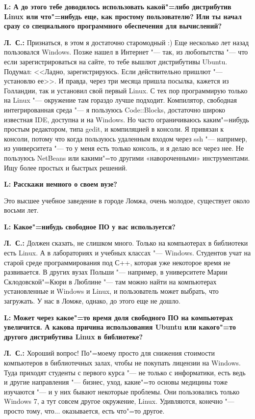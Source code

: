 \documentclass[10pt, a5paper]{article}
\begin{document}
{\noindent \bf L: А до этого тебе доводилось использовать какой"=либо дистрибутив Linux или что"=нибудь еще, как простому пользователю? Или ты начал сразу со специального программного обеспечения для вычислений?}

{\noindent \bf Л.~С.:} Признаться, в этом я достаточно старомодный :) Еще несколько лет назад пользовался Windows. Позже нашел в Интернет "--- так, из любопытства "--- что если зарегистрироваться на сайте, то тебе вышлют дистрибутивы Ubuntu. Подумал: <<Ладно, зарегистрируюсь. Если действительно пришлют "--- установлю ее>>. И правда, через три месяца пришла посылка, кажется из Голландии, так и установил свой первый Linux. С тех пор программирую только на Linux "--- окружение там гораздо лучше подходит. Компилятор, свободная интегрированная среда "--- я пользуюсь Code::Blocks, достаточно широко известная IDE, доступна и на Windows. Но часто ограничиваюсь каким"=нибудь простым редактором, типа gedit, и компиляцией в консоли. Я привязан к консоли, потому что когда пользуюсь удаленным входом через ssh "--- например, из университета "--- то у меня есть только консоль, и я делаю все через нее. Не пользуюсь NetBeans или какими"=то другими «навороченными» инструментами. Ищу более простых и быстрых решений.

{\noindent \bf L: Расскажи немного о своем вузе?}

\noindent Это высшее учебное заведение в городе Ломжа, очень молодое, существует около восьми лет. 

{\noindent \bf L: Какое"=нибудь свободное ПО у вас используется?}

{\noindent \bf Л.~С.:} Должен сказать, не слишком много. Только на компьютерах в библиотеки есть Linux. А в лабораториях и учебных классах "--- Windows. Студентов учат на старой среде программирования под С++, которая уже некоторое время не развивается. В других вузах Польши "--- например, в университете Марии Склодовской"=Кюри в Люблине "--- там можно найти на компьютерах установленные и Windows и Linux, и пользователь может выбрать, что загружать. У нас в Ломже, однако, до этого еще не дошло.

{\noindent \bf L: Может через какое"=то время доля свободного ПО на компьютерах увеличится. А какова причина использования Ubuntu или какого"=то другого дистрибутива Linux в библиотеке?}

{\noindent \bf Л.~С.:} Хороший вопрос! По"=моему просто для снижения стоимости компьютеров в библиотечных залах, чтобы не покупать лицензии на Windows. Туда приходят студенты с первого курса "--- не только с информатики, есть ведь и другие направления "--- бизнес, уход, какие"=то основы медицины тоже изучаются "--- и у них бывают некоторые проблемы. Они пользовались только Windows 7, а тут совсем другое окружение, Linux. Удивляются, конечно "--- просто тому, что... оказывается, есть что"=то другое. 
\end{document}
